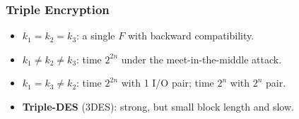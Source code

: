 \begin{frame}\frametitle{Triple Encryption}
\begin{figure}
\begin{center}

\end{center}
\end{figure}
\begin{itemize}
\item $k_1 = k_2 = k_3$: a single $F$ with backward compatibility.
\item $k_1 \neq k_2 \neq k_3$: time $2^{2n}$ under the meet-in-the-middle attack.
\item $k_1 = k_3 \neq k_2$: time $2^{2n}$ with 1 I/O pair; time $2^{n}$ with $2^n$ pair.
\item \textbf{Triple-DES} (3DES): strong, but small block length and slow.
\end{itemize}
\end{frame}
